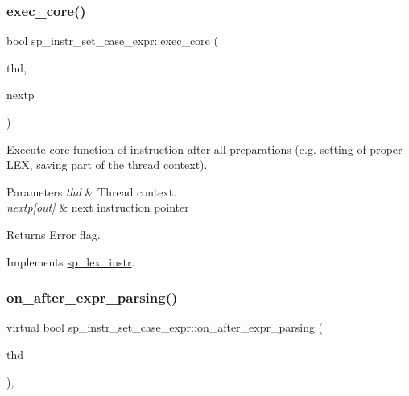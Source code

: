 \subsubsection{\texorpdfstring{exec\+\_\+core()}{exec\_core()}}
{\footnotesize\ttfamily bool sp\+\_\+instr\+\_\+set\+\_\+case\+\_\+expr\+::exec\+\_\+core (\begin{DoxyParamCaption}\item[{T\+HD $\ast$}]{thd,  }\item[{uint $\ast$}]{nextp }\end{DoxyParamCaption})\hspace{0.3cm}{\ttfamily [virtual]}}

Execute core function of instruction after all preparations (e.\+g. setting of proper L\+EX, saving part of the thread context).


\begin{DoxyParams}{Parameters}
{\em thd} & Thread context. \\
\hline
{\em nextp\mbox{[}out\mbox{]}} & next instruction pointer\\
\hline
\end{DoxyParams}
\begin{DoxyReturn}{Returns}
Error flag. 
\end{DoxyReturn}


Implements \mbox{\hyperlink{classsp__lex__instr_acab4e56f638f43101c11f838e1f9d395}{sp\+\_\+lex\+\_\+instr}}.

\mbox{\label{classsp__instr__set__case__expr_a041681a8ad6a4b3aeda887f5537ad624}} 
\subsubsection{\texorpdfstring{on\+\_\+after\+\_\+expr\+\_\+parsing()}{on\_after\_expr\_parsing()}}
{\footnotesize\ttfamily virtual bool sp\+\_\+instr\+\_\+set\+\_\+case\+\_\+expr\+::on\+\_\+after\+\_\+expr\+\_\+parsing (\begin{DoxyParamCaption}\item[{T\+HD $\ast$}]{thd }\end{DoxyParamCaption})\hspace{0.3cm}{\ttfamily [inline]}, {\ttfamily [virtual]}}

